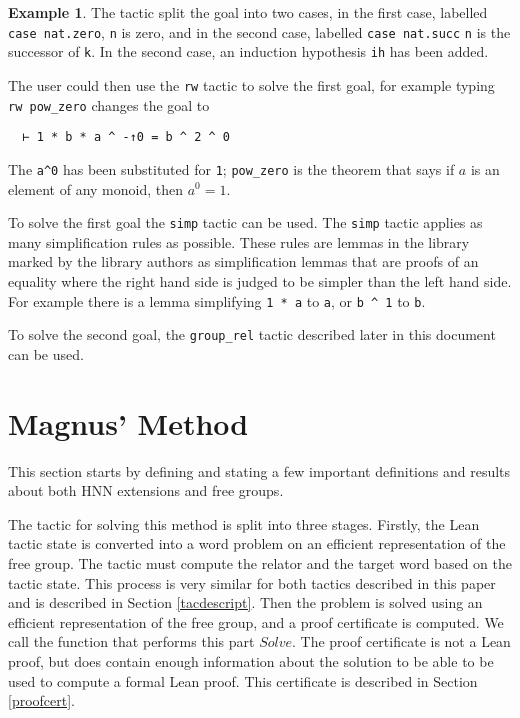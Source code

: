 \documentclass[12pt]{article} %
\theoremstyle{definition}
\theoremstyle{definition}
\theoremstyle{definition}
\theoremstyle{definition}
\theoremstyle{definition}
\theoremstyle{definition}
\newtheorem{exmpl}{Example}[theorem]
\begin{document}
\begin{exmpl}
The tactic split the goal into two cases, in the first case, labelled \lstinline{case nat.zero},
\lstinline{n} is zero, and in the second case, labelled \lstinline{case nat.succ}
\lstinline{n} is the successor of \lstinline{k}. In the second case, an induction
hypothesis \lstinline{ih} has been added.

The user could then use the \lstinline{rw} tactic to solve the first goal,
for example typing \lstinline{rw pow_zero} changes the goal to
\begin{lstlisting}
  ⊢ 1 * b * a ^ -↑0 = b ^ 2 ^ 0
\end{lstlisting}

The \lstinline{a^0} has been substituted
for \lstinline{1}; \lstinline{pow_zero} is the theorem that says if $a$ is an
element of any monoid, then $a^0= 1$.

To solve the first goal the \lstinline{simp} tactic can be used.
The \lstinline{simp} tactic applies as many simplification rules as possible.
These rules are lemmas in the library marked by the library authors as simplification
lemmas that are proofs of an equality where the right hand side is judged to be simpler
than the left hand side. For example there is a lemma simplifying \lstinline{1 * a} to
\lstinline{a}, or \lstinline{b ^ 1} to \lstinline{b}.

To solve the second goal, the \lstinline{group_rel} tactic described later in this document can be used.

\end{exmpl}

\section{Magnus' Method}

This section starts by defining and stating a few important definitions and results about both
HNN extensions and free groups.

The tactic for solving this method is split into three stages. Firstly, the Lean tactic state
is converted into a word problem on an efficient representation of the free group. The tactic must
compute the relator and the target word based on the tactic state. This process is very similar
for both tactics described in this paper and is described in Section \ref{tacdescript}. Then
the problem is solved using an efficient representation of the free group, and a proof certificate
is computed. We call the function that performs this part $\textit{Solve}$.
 The proof certificate is not a Lean proof, but does contain enough information
about the solution to be able to be used to compute a formal Lean proof. This certificate is
described in Section \ref{proofcert}.
\end{document}
